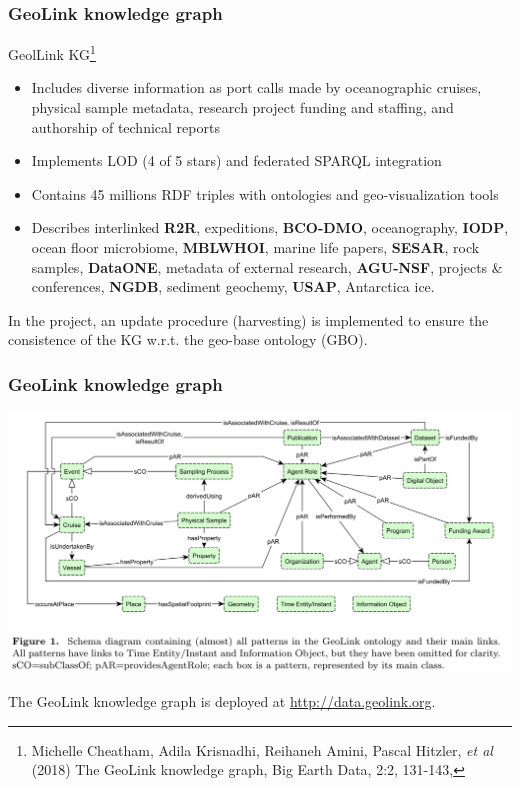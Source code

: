 \documentclass[10pt]{beamer}
\begin{document}
\begin{frame}[fragile]
  \frametitle{\textbf{GeoLink} knowledge graph}
  GeolLink KG\footnote{Michelle Cheatham, Adila Krisnadhi, Reihaneh Amini, Pascal Hitzler, \emph{et al} (2018) The GeoLink knowledge graph, Big Earth Data, 2:2, 131-143, }
  \begin{itemize}
  \item Includes diverse information as port calls made by oceanographic cruises, physical sample metadata, research project funding and staffing, and authorship of technical reports
  \item Implements LOD (4 of 5 stars) and federated SPARQL integration
  \item Contains 45 millions RDF triples with ontologies and geo-visualization tools
  \item Describes interlinked \textbf{R2R}, expeditions, \textbf{BCO-DMO}, oceanography, \textbf{IODP}, ocean floor microbiome, \textbf{MBLWHOI}, marine life papers, \textbf{SESAR}, rock samples, \textbf{DataONE}, metadata of external research,  \textbf{AGU-NSF}, projects \& conferences, \textbf{NGDB}, sediment geochemy, \textbf{USAP}, Antarctica ice.
  \end{itemize}
  In the project, an update procedure (harvesting) is implemented to ensure the consistence of the KG w.r.t. the geo-base ontology (GBO).
\end{frame}

\begin{frame}
  \frametitle{GeoLink knowledge graph}
  \begin{center}
  \includegraphics[width=\linewidth]{geolink-onto.png}
  \end{center}
  The GeoLink knowledge graph is deployed at \url{http://data.geolink.org}.
\end{frame}
\end{document}
